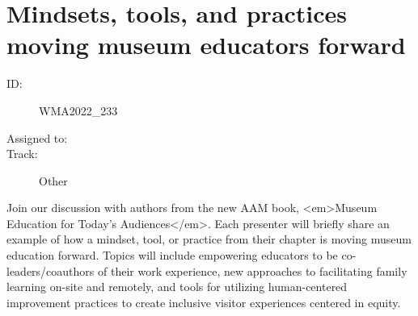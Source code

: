 \documentclass{report}
\begin{document}
        
          \newpage
          \section{ Mindsets, tools, and practices moving museum educators forward }
            \begin{description}
              \item [ID:]
              WMA2022\_233

              \item [Assigned to:]
                \item [Track:]Other~
              \end{description}

              Join our discussion with authors from the new AAM book, <em>Museum Education for Today’s Audiences</em>. Each presenter will briefly share an example of how a mindset, tool, or practice from their chapter is moving museum education forward. Topics will include empowering educators to be co-leaders/coauthors of their work experience, new approaches to facilitating family learning on-site and remotely, and tools for utilizing human-centered improvement practices to create inclusive visitor experiences centered in equity.
\end{document}

